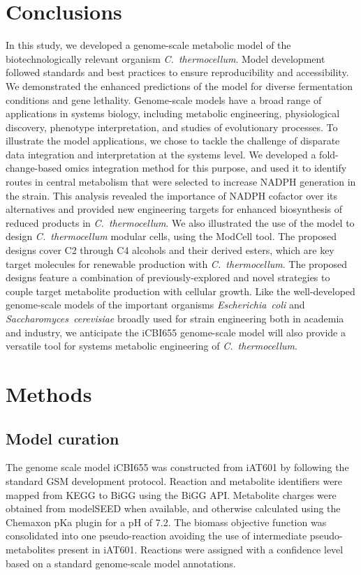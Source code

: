 \section{Conclusions}
In this study, we developed a genome-scale metabolic model of the biotechnologically relevant organism \textit{C.~thermocellum}.
Model development followed standards and best practices to ensure reproducibility and accessibility.
We demonstrated the enhanced predictions of the model for diverse fermentation conditions and gene lethality. %
Genome-scale models have a broad range of applications in systems biology, including metabolic engineering, physiological discovery, phenotype interpretation, and studies of evolutionary processes. \citep{feist2008, palsson2015} To illustrate the model applications, we chose to tackle the challenge of disparate data integration and interpretation at the systems level. We developed a fold-change-based omics integration method for this purpose, and used it to identify routes in central metabolism that were selected to increase NADPH generation in the  strain. This analysis revealed the importance of NADPH cofactor over its alternatives and provided new engineering targets for enhanced biosynthesis of reduced products in \textit{C.~thermocellum}.
We also illustrated the use of the model to design \textit{C.~thermocellum} modular cells, using the ModCell tool.\citep{garcia2019b} The proposed designs cover C2 through C4 alcohols and their derived esters, which are key target molecules for renewable production with \textit{C.~thermocellum}.\citep{peters2018}
The proposed designs feature a combination of previously-explored and novel strategies to couple target metabolite production with cellular growth.
Like the well-developed genome-scale models\citep{monk2017, lu2019} of the important organisms \textit{Escherichia~coli} and \textit{Saccharomyces~cerevisiae} broadly used for strain engineering both in academia\citep{blazeck2010} and industry\citep{yim2011a}, we anticipate the iCBI655 genome-scale model will also provide a versatile tool for systems metabolic engineering of \textit{C.~thermocellum}.

\section{Methods}

\subsection{Model curation}
The genome scale model iCBI655 was constructed from  iAT601\citep{thompson2016} by following the standard GSM development
protocol.\citep{thiele2010}
Reaction and metabolite identifiers were mapped from KEGG to BiGG using the BiGG API.\citep{king2015}
Metabolite charges were obtained from modelSEED when available, and otherwise calculated using the Chemaxon pKa plugin\citep{szegezdi2007} for a pH of 7.2.\citep{thiele2010}
The biomass objective function was consolidated into one pseudo-reaction avoiding the use of intermediate pseudo-metabolites present in iAT601.
Reactions were assigned with a confidence level based on a standard genome-scale model annotations.\citep{thiele2010}

